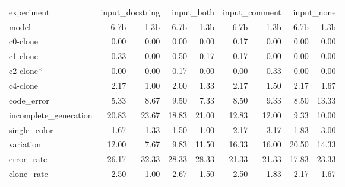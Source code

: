 \begin{tabular}{lrrrrrrrr}
\toprule
experiment & \multicolumn{2}{r}{input_docstring} & \multicolumn{2}{r}{input_both} & \multicolumn{2}{r}{input_comment} & \multicolumn{2}{r}{input_none} \\
model & 6.7b & 1.3b & 6.7b & 1.3b & 6.7b & 1.3b & 6.7b & 1.3b \\
\midrule
c0-clone & 0.00 & 0.00 & 0.00 & 0.00 & 0.17 & 0.00 & 0.00 & 0.00 \\
c1-clone & 0.33 & 0.00 & 0.50 & 0.17 & 0.17 & 0.00 & 0.00 & 0.00 \\
c2-clone* & 0.00 & 0.00 & 0.17 & 0.00 & 0.00 & 0.33 & 0.00 & 0.00 \\
c4-clone & 2.17 & 1.00 & 2.00 & 1.33 & 2.17 & 1.50 & 2.17 & 1.67 \\
code_error & 5.33 & 8.67 & 9.50 & 7.33 & 8.50 & 9.33 & 8.50 & 13.33 \\
incomplete_generation & 20.83 & 23.67 & 18.83 & 21.00 & 12.83 & 12.00 & 9.33 & 10.00 \\
single_color & 1.67 & 1.33 & 1.50 & 1.00 & 2.17 & 3.17 & 1.83 & 3.00 \\
variation & 12.00 & 7.67 & 9.83 & 11.50 & 16.33 & 16.00 & 20.50 & 14.33 \\
error_rate & 26.17 & 32.33 & 28.33 & 28.33 & 21.33 & 21.33 & 17.83 & 23.33 \\
clone_rate & 2.50 & 1.00 & 2.67 & 1.50 & 2.50 & 1.83 & 2.17 & 1.67 \\
\bottomrule
\end{tabular}
